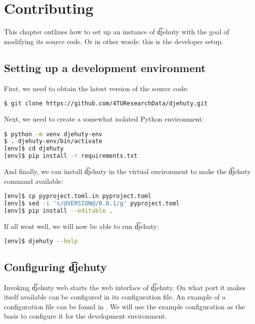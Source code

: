 \chapter{Contributing}

This chapter outlines how to set up an instance of \t{djehuty} with the goal
of modifying its source code.  Or in other words: this is the developer setup.

\section{Setting up a development environment}

First, we need to obtain the latest version of the source code:
\begin{lstlisting}[language=bash]
$ git clone https://github.com/4TUResearchData/djehuty.git
\end{lstlisting}

Next, we need to create a somewhat isolated Python environment:
\begin{lstlisting}[language=bash]
$ python -m venv djehuty-env
$ . djehuty-env/bin/activate
[env]$ cd djehuty
[env]$ pip install -r requirements.txt
\end{lstlisting}

And finally, we can install \t{djehuty} in the virtual environment to make
the \t{djehuty} command available:
\begin{lstlisting}[language=bash]
[env]$ cp pyproject.toml.in pyproject.toml
[env]$ sed -i 's/@VERSION@/0.0.1/g' pyproject.toml
[env]$ pip install --editable .
\end{lstlisting}

If all went well, we will now be able to run \t{djehuty}:
\begin{lstlisting}[language=bash]
[env]$ djehuty --help
\end{lstlisting}

\section{Configuring \t{djehuty}}

Invoking \t{djehuty web} starts the web interface of \t{djehuty}.  On what
port it makes itself available can be configured in its configuration file.
An example of a configuration file can be found in
.  We will use the example
configuration as the basis to configure it for the development environment.

